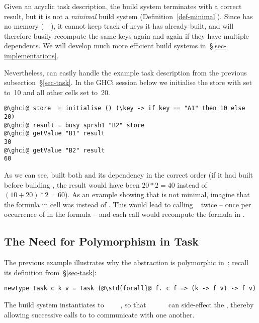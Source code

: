 Given an acyclic task description, the  build system terminates with a
correct result, but it is not a \emph{minimal} build system
(Definition~\ref{def-minimal}). Since  has no memory
(~\hs{=}~\hs{()}), it cannot keep track of keys it has already built, and
will therefore busily recompute the same keys again and again if they have
multiple dependents. We will develop much more efficient build systems
in~\S\ref{sec-implementations}.

Nevertheless,  can easily handle the example task description
 from the previous subsection~\S\ref{sec-task}. In the GHCi session
below we initialise the store with  set to~10 and all other cells set
to~20.

\vspace{1mm}
\begin{verbatim}
@\ghci@ store  = initialise () (\key -> if key == "A1" then 10 else 20)
@\ghci@ result = busy sprsh1 "B2" store
@\ghci@ getValue "B1" result
30
@\ghci@ getValue "B2" result
60
\end{verbatim}
\vspace{1mm}

\noindent
As we can see,  built both  and its dependency  in the
correct order (if it had built  before building , the result would
have been $20 * 2 = 40$ instead of $(10 + 20) * 2 = 60$). As an example showing
that  is not minimal, imagine that the formula in cell  was
 instead of . This would lead to calling
~ twice -- once per occurrence of  in the
formula -- and each call would recompute the formula in .

\subsection{The Need for Polymorphism in Task}\label{sec-why-polymorphism}

The previous example illustrates why the  abstraction is polymorphic
in~; recall its definition from~\S\ref{sec-task}:

\begin{verbatim}
newtype Task c k v = Task (@\std{forall}@ f. c f => (k -> f v) -> f v)
\end{verbatim}

\noindent
The  build system instantiates  to
~~~~,
so that ~\hs{::}~~\hs{->}~~ can side-effect the
, thereby allowing successive calls to  to communicate with
one another.

